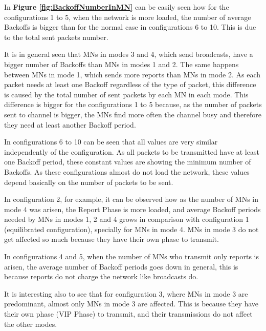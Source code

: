 In \textbf{Figure \ref{fig:BackoffNumberInMN}} can be easily seen how for the configurations 1 to 5, when the network is more loaded, the number of 
average Backoffs is bigger than for the normal case in configurations 6 to 10. This is due to the total sent packets number.

It is in general seen that \acp{MN} in modes 3 and 4, which send broadcasts, have a bigger number of Backoffs than \acp{MN} in modes 1 and 2. The same 
happens between \acp{MN} in mode 1, which sends more reports than \acp{MN} in mode 2. As each packet needs at least one Backoff regardless of the type of 
packet, this difference is caused by the total number of sent packets by each \ac{MN} in each mode. This difference is bigger for the configurations 1 
to 5 because, as the number of packets sent to channel is bigger, the \acp{MN} find more often the channel busy and therefore they need at least another Backoff
period.

In configurations 6 to 10 can be seen that all values are very similar independently of the configuration. As all packets to be transmitted have at least
one Backoff period, these constant values are showing the minimum number of Backoffs. As these configurations almost do not load the network, these values 
depend basically on the number of packets to be sent.

In configuration 2, for example, it can be observed how as the number of \acp{MN} in mode 4 was arisen, the Report Phase is more loaded, and average
Backoff periods needed by \acp{MN} in modes 1, 2 and 4 grows in comparison with configuration 1 (equilibrated configuration), specially for \acp{MN} in
mode 4. \acp{MN} in mode 3 do not get affected so much because they have their own phase to transmit.

In configurations 4 and 5, when the number of \acp{MN} who transmit only reports is arisen, the average number of Backoff periods goes down in general,
this is because reports do not charge the network like broadcasts do.

It is interesting also to see that for configuration 3, where \acp{MN} in mode 3 are predominant, almost only \acp{MN} in mode 3 are affected. This is
because they have their own phase (\ac{VIP} Phase) to transmit, and their transmissions do not affect the other modes.

